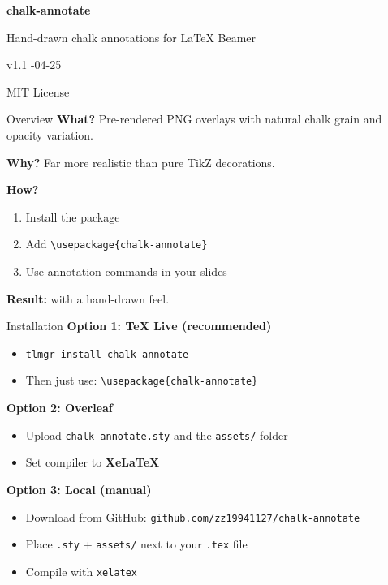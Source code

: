 \documentclass[aspectratio=169, 11pt]{beamer}
\begin{document}
\begin{frame}[c]
  \centering
  {\Large\bfseries chalk-annotate}\par
  \vspace{0.5em}
  {\normalsize Hand-drawn chalk annotations for \LaTeX{} Beamer}\par
  \vspace{1em}
  {\small v1.1 -04-25}\par
  \vspace{0.3em}
  {\small\color{gray} MIT License}
\end{frame}

\begin{frame}{Overview}
  \textbf{What?}
  Pre-rendered PNG overlays with natural chalk grain and opacity variation.

  \vspace{0.8em}
  \textbf{Why?}
  Far more realistic than pure TikZ decorations.

  \vspace{0.8em}
  \textbf{How?}
  \begin{enumerate}
    \item Install the package
    \item Add \texttt{\textbackslash usepackage\{chalk-annotate\}}
    \item Use annotation commands in your slides
  \end{enumerate}

  \vspace{0.8em}
  \textbf{Result:}  with a hand-drawn feel.
\end{frame}

\begin{frame}{Installation}
  \textbf{Option 1: TeX Live (recommended)}
  \begin{itemize}
    \item \texttt{tlmgr install chalk-annotate}
    \item Then just use: \texttt{\textbackslash usepackage\{chalk-annotate\}}
  \end{itemize}

  \vspace{0.8em}
  \textbf{Option 2: Overleaf}
  \begin{itemize}
    \item Upload \texttt{chalk-annotate.sty} and the \texttt{assets/} folder
    \item Set compiler to \textbf{XeLaTeX}
  \end{itemize}

  \vspace{0.8em}
  \textbf{Option 3: Local (manual)}
  \begin{itemize}
    \item Download from GitHub: \texttt{github.com/zz19941127/chalk-annotate}
    \item Place \texttt{.sty} + \texttt{assets/} next to your \texttt{.tex} file
    \item Compile with \texttt{xelatex}
  \end{itemize}
\end{frame}
\end{document}
